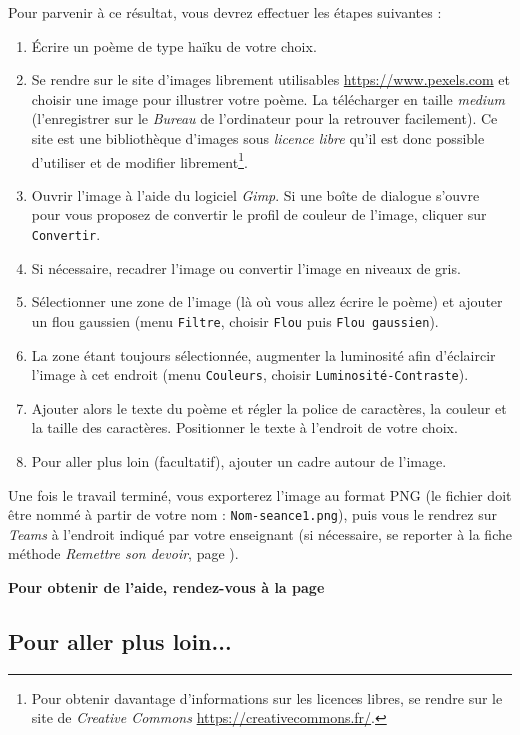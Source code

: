 {Pour parvenir à ce résultat, vous devrez effectuer les étapes suivantes :
\begin{enumerate}
\item Écrire un poème de type haïku de votre choix.
\item Se rendre sur le site d'images librement utilisables \url{https://www.pexels.com} et choisir une image pour illustrer votre poème. La télécharger en taille \emph{medium} (l'enregistrer sur le \emph{Bureau} de l'ordinateur pour la retrouver facilement). Ce site est une bibliothèque d'images sous \emph{licence libre} qu'il est donc possible d'utiliser et de modifier librement\footnote{Pour obtenir davantage d'informations sur les licences libres, se rendre sur le site de \emph{Creative Commons} \url{https://creativecommons.fr/}.}.
\item Ouvrir l'image à l'aide du logiciel \emph{Gimp}. Si une boîte de dialogue s'ouvre pour vous proposez de convertir le profil de couleur de l'image, cliquer sur \texttt{Convertir}.
\item Si nécessaire, recadrer l'image ou convertir l'image en niveaux de gris.
\item Sélectionner une zone de l'image (là où vous allez écrire le poème) et ajouter un flou gaussien (menu \texttt{Filtre}, choisir \texttt{Flou} puis \texttt{Flou gaussien}).   
\item La zone étant toujours sélectionnée, augmenter la luminosité afin d'éclaircir l'image à cet endroit (menu \texttt{Couleurs}, choisir \texttt{Luminosité-Contraste}). 
\item Ajouter alors le texte du poème et régler la police de caractères, la couleur et la taille des caractères. Positionner le texte à l'endroit de votre choix.
\item Pour aller plus loin (facultatif), ajouter un cadre autour de l'image.
\end{enumerate}
\vspace{10pt}
Une fois le travail terminé, vous exporterez l'image au format PNG (le fichier doit être nommé à partir de votre nom : \texttt{Nom-seance1.png}), puis vous le rendrez sur \emph{Teams} à l'endroit indiqué par votre enseignant (si nécessaire, se reporter à la fiche méthode \emph{Remettre son devoir}, page \pageref{TeamsRemettreDevoir}).}

\textbf{Pour obtenir de l'aide, rendez-vous à la page \pageref{Image5eOutils}}

\subsection{Pour aller plus loin...}

